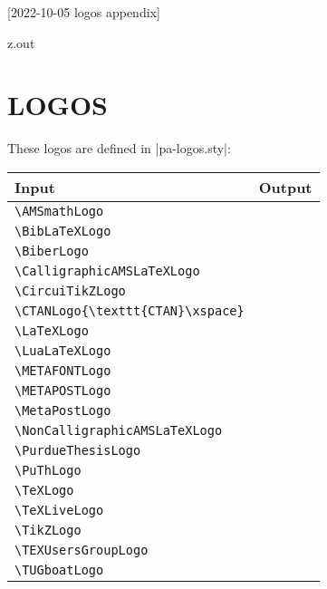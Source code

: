 [2022-10-05 logos appendix]

\begin{VerbatimOut}{z.out}
\chapter{LOGOS}

These logos are defined in |pa-logos.sty|:

\begin{tabular}{@{}ll@{}}
  \toprule
  \bfseries Input& \bfseries Output\\
  \midrule
  \verb+\AMSmathLogo+& \AMSmathLogo\\[2pt]
  \verb+\BibLaTeXLogo+& \BibLaTeXLogo\\[2pt]
  \verb+\BiberLogo+& \BiberLogo\\[2pt]
  \verb+\CalligraphicAMSLaTeXLogo+& \CalligraphicAMSLaTeXLogo\\[2pt]
  \verb+\CircuiTikZLogo+& \CircuiTikZLogo\\[2pt]
  \verb+\CTANLogo{\texttt{CTAN}\xspace}+& \CTANLogo\\[2pt]
  \verb+\LaTeXLogo+& \LaTeXLogo\\[2pt]
  \verb+\LuaLaTeXLogo+& \LuaLaTeXLogo\\[2pt]
  \verb+\METAFONTLogo+& \METAFONTLogo\\[2pt]
  \verb+\METAPOSTLogo+& \METAPOSTLogo\\[2pt]
  \verb+\MetaPostLogo+& \MetaPostLogo\\[2pt]
  \verb+\NonCalligraphicAMSLaTeXLogo+& \NonCalligraphicAMSLaTeXLogo\\[2pt]
  \verb+\PurdueThesisLogo+& \PurdueThesisLogo\\[2pt]
  \verb+\PuThLogo+& \PuThLogo\\[2pt]
  \verb+\TeXLogo+& \TeXLogo\\[2pt]
  \verb+\TeXLiveLogo+& \TeXLiveLogo\\[2pt]
  \verb+\TikZLogo+& \TikZLogo\\[2pt]
  \verb+\TEXUsersGroupLogo+& \TeXUsersGroupLogo\\[2pt]
  \verb+\TUGboatLogo+& \TUGboatLogo\\[2pt]
  \bottomrule
\end{tabular}
\end{VerbatimOut}

\MyIO
